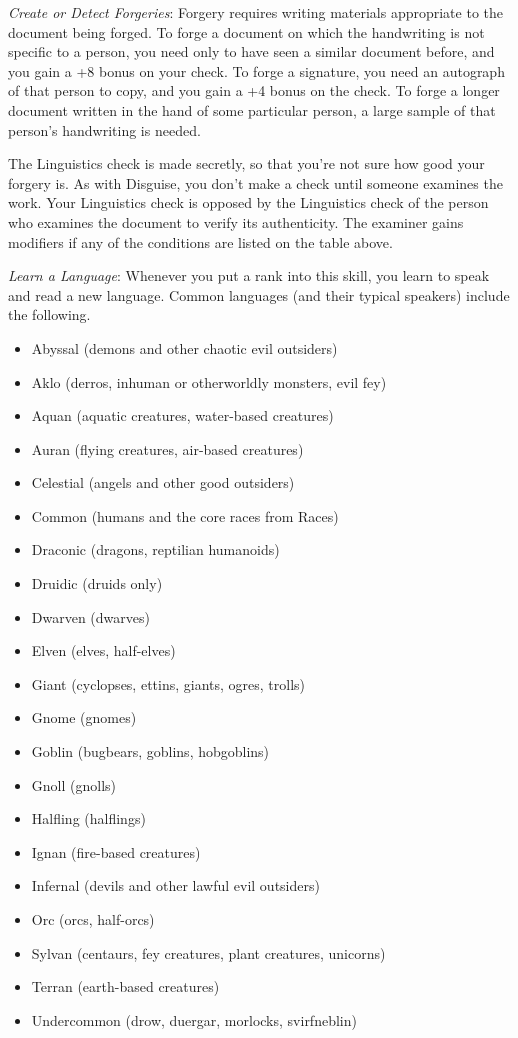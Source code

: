 \textit{Create or Detect Forgeries}: Forgery requires writing materials appropriate to the document being forged. To forge a document on which the handwriting is not specific to a person, you need only to have seen a similar document before, and you gain a +8 bonus on your check. To forge a signature, you need an autograph of that person to copy, and you gain a +4 bonus on the check. To forge a longer document written in the hand of some particular person, a large sample of that person's handwriting is needed.
				
The Linguistics check is made secretly, so that you're not sure how good your forgery is. As with Disguise, you don't make a check until someone examines the work. Your Linguistics check is opposed by the Linguistics check of the person who examines the document to verify its authenticity. The examiner gains modifiers if any of the conditions are listed on the table above.
				
\textit{Learn a Language}: Whenever you put a rank into this skill, you learn to speak and read a new language. Common languages (and their typical speakers) include the following.
				\begin{itemize}\item  Abyssal (demons and other chaotic evil outsiders)
				\item  Aklo (derros, inhuman or otherworldly monsters, evil fey)
				\item  Aquan (aquatic creatures, water-based creatures)
				\item  Auran (flying creatures, air-based creatures)
				\item  Celestial (angels and other good outsiders)
				\item  Common (humans and the core races from Races)
				\item  Draconic (dragons, reptilian humanoids)
				\item  Druidic (druids only)
				\item  Dwarven (dwarves)
				\item  Elven (elves, half-elves)
				\item  Giant (cyclopses, ettins, giants, ogres, trolls)
				\item  Gnome (gnomes)
				\item  Goblin (bugbears, goblins, hobgoblins)
				\item  Gnoll (gnolls)
				\item  Halfling (halflings)
				\item  Ignan (fire-based creatures)
				\item  Infernal (devils and other lawful evil outsiders)
				\item  Orc (orcs, half-orcs)
				\item  Sylvan (centaurs, fey creatures, plant creatures, unicorns)
				\item  Terran (earth-based creatures)
				\item  Undercommon (drow, duergar, morlocks, svirfneblin)
\end{itemize}
				
